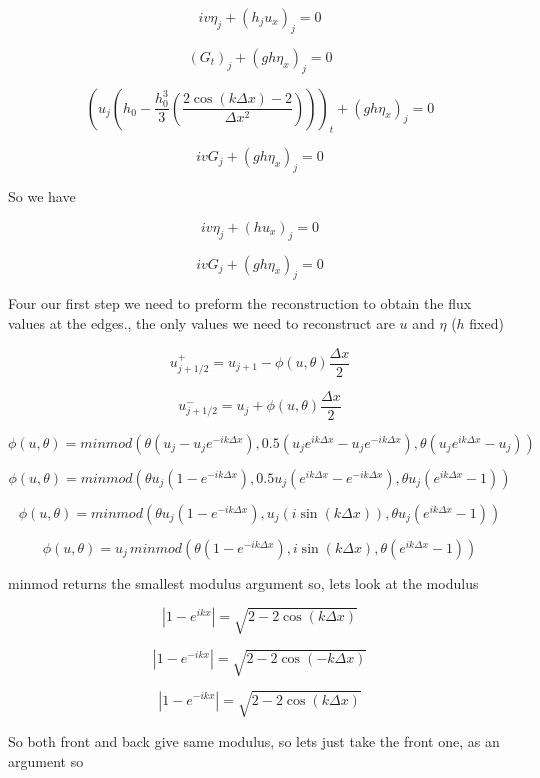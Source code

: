 \documentclass[12pt]{article}
\begin{document}
\[iv\eta_j +  \left(h_j u_x \right)_j = 0\]

\[ \left(G_t\right)_j  + \left(gh \eta_x \right)_j  = 0\]


\[ \left(u_j \left( h_0 -  \frac{h_0^3}{3} \left(\dfrac{2\cos\left(k{\Delta x}\right) - 2}{\Delta x^2}\right) \right)\right)_t  + \left(gh \eta_x \right)_j  = 0\]

\[iv G_j + \left(gh \eta_x \right)_j  = 0\]

So we have 

\[iv\eta_j +  \left(h u_x \right)_j = 0\]

\[iv G_j + \left(gh \eta_x \right)_j  = 0\]

Four our first step we need to preform the reconstruction to obtain the flux values at the edges., the only values we need to reconstruct are $u$ and $\eta$ ($h$ fixed)

\[u^+_{j + 1/2} = u_{j+1} - \phi\left(u,\theta\right) \frac{\Delta x}{2} \]

\[u^-_{j + 1/2} = u_{j} + \phi\left(u,\theta\right) \frac{\Delta x}{2} \]

\[\phi\left(u,\theta\right) = minmod \left( \theta \left(u_j - u_{j} e^{-ik\Delta x}\right), 0.5\left(u_{j}e^{ik\Delta x} - u_{j}e^{-ik\Delta x}\right)  , \theta \left(u_{j} e^{ik\Delta x} - u_{j}\right) \right) \]

\[\phi\left(u,\theta\right) = minmod \left( \theta u_j \left( 1- e^{-ik\Delta x}\right), 0.5u_j\left(e^{ik\Delta x} - e^{-ik\Delta x}\right)  , \theta u_j \left( e^{ik\Delta x} - 1\right) \right) \]

\[\phi\left(u,\theta\right) = minmod \left( \theta u_j \left( 1- e^{-ik\Delta x}\right), u_j\left(i\sin\left(k \Delta x\right)\right)  , \theta u_j \left( e^{ik\Delta x} - 1\right) \right) \]

\[\phi\left(u,\theta\right) = u_j \, minmod \left( \theta\left( 1- e^{-ik\Delta x}\right), i\sin\left(k \Delta x\right)  , \theta \left( e^{ik\Delta x} - 1\right) \right) \]

minmod returns the smallest modulus argument so, lets look at the modulus

\[| 1 - e^{ikx}| = \sqrt{2 - 2\cos \left(k\Delta x\right)} \]

\[| 1 - e^{-ikx}| = \sqrt{2 - 2\cos \left(-k\Delta x\right)} \]

\[| 1 - e^{-ikx}| = \sqrt{2 - 2\cos \left(k\Delta x\right)} \]

So both front and back give same modulus, so lets just take the front one, as an argument so
\end{document}
